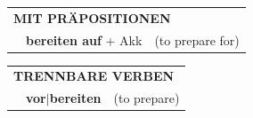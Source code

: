 \documentclass[10pt,a4paper]{revtex4-2}
\begin{document}
\begin{verbbox-acc}
\vspace{10pt}

\begin{tabular}{lll}
\multicolumn{3}{l}{\textbf{MIT PRÄPOSITIONEN}}\\
& \textbf{bereiten auf} + Akk & (to prepare for)\\
\end{tabular}
\hfill
\begin{tabular}{lll}
\multicolumn{3}{l}{\textbf{TRENNBARE VERBEN}}\\
& \textbf{vor$|$bereiten} & (to prepare)\\
\end{tabular}

\vspace{-5pt}
\end{verbbox-acc}
\end{document}
